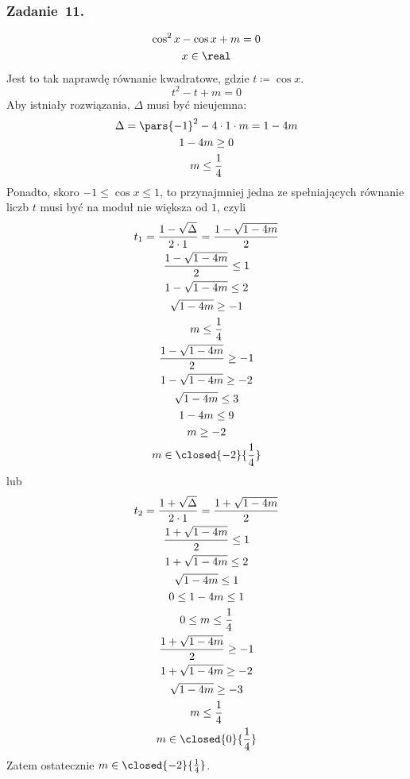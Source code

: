 \subsubsection*{Zadanie~11.}
\begin{gather*}
    \cos^2x - \cos x + m = 0\\
    x \in \real
\end{gather*}
Jest to tak naprawdę równanie kwadratowe, gdzie \(t \coloneqq \cos x\).
\begin{equation*}
    t^2 - t + m = 0
\end{equation*}
Aby istniały rozwiązania, \(\Delta\) musi być nieujemna:
\begin{gather*}
    \Delta = \pars{-1}^2 - 4 \cdot 1 \cdot m = 1 - 4m\\
    1 - 4m \geq 0\\
    m \leq \frac{1}{4}
\end{gather*}
Ponadto, skoro \(-1 \leq \cos x \leq 1\), to przynajmniej jedna ze spełniających równanie liczb \(t\) musi być na moduł nie większa od \(1\), czyli
\begin{gather*}
    t_1 = \frac{1 - \sqrt{\Delta}}{2 \cdot 1} = \frac{1 - \sqrt{1 - 4m}}{2}\\
    \frac{1 - \sqrt{1 - 4m}}{2} \leq 1\\
    1 - \sqrt{1 - 4m} \leq 2\\
    \sqrt{1 - 4m} \geq -1\\
    m \leq \frac{1}{4}\\
    \frac{1 - \sqrt{1 - 4m}}{2} \geq -1\\
    1 - \sqrt{1 - 4m} \geq -2\\
    \sqrt{1 - 4m} \leq 3\\
    1 - 4m \leq 9\\
    m \geq -2\\
    m \in \closed{-2}{\frac{1}{4}}
\end{gather*}
lub
\begin{gather*}
    t_2 = \frac{1 + \sqrt{\Delta}}{2 \cdot 1} = \frac{1 + \sqrt{1 - 4m}}{2}\\
    \frac{1 + \sqrt{1 - 4m}}{2} \leq 1\\
    1 + \sqrt{1 - 4m} \leq 2\\
    \sqrt{1 - 4m} \leq 1\\
    0 \leq 1 - 4m \leq 1\\
    0 \leq m \leq \frac{1}{4}\\
    \frac{1 + \sqrt{1 - 4m}}{2} \geq -1\\
    1 + \sqrt{1 - 4m} \geq -2\\
    \sqrt{1 - 4m} \geq -3\\
    m \leq \frac{1}{4}\\
    m \in \closed{0}{\frac{1}{4}}
\end{gather*}
Zatem ostatecznie \(m \in \closed{-2}{\frac{1}{4}}\).
